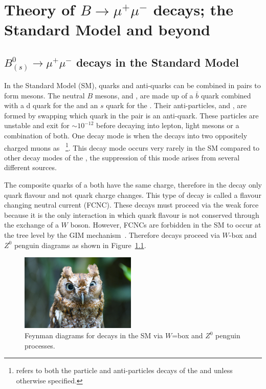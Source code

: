 \chapter{Theory of $B\to \mu^+ \mu^-$ decays; the Standard Model and beyond}

\section{$B^0_{(s)}\to \mu^+ \mu^-$ decays in the Standard Model}
\label{sec:bsmumu_in_SM}
In the Standard Model (SM), quarks and anti-quarks can be combined in pairs to form mesons. The neutral $B$ mesons, \bd and \bs, are made up of a $\bar{b}$ quark combined with a d quark for the \bd and an $s$ quark for the \bs. Their anti-particles, \barbd and \barbs, are formed by swapping which quark in the pair is an anti-quark. These particles are unstable and exit for $\sim 10^{-12}$ before decaying into lepton, light mesons or a combination of both. One decay mode is when the \bsd decays into two oppositely charged muons as \bmumu~\footnote{\bmumu refers to both the particle and anti-particles decays of the \bd and \bs unless otherwise specified.}. This decay mode occurs very rarely in the SM compared to other decay modes of the \bsd, the suppression of this mode arises from several different sources.

The composite quarks of a \bsd both have the same charge, therefore in the decay \bmumu only quark flavour and not quark charge changes. This type of decay is called a flavour changing neutral current (FCNC). These decays must proceed via the weak force because it is the only interaction in which quark flavour is not conserved through the exchange of a $W$ boson. However, FCNCs are forbidden in the SM to occur at the tree level by the GIM mechanism~\cite{}. Therefore \bmumu decays proceed via $W$-box and $Z^0$ penguin diagrams as shown in Figure~\ref{fig:SM_diag}.

\begin{figure}[htbp]
    \centering
        \includegraphics[width=0.49\textwidth]{./Figs/placeholder.jpeg}
    \caption{Feynman diagrams for \bmumu decays in the SM via $W$=box and $Z^0$ penguin processes.}
    \label{fig:SM_diag}
\end{figure}

